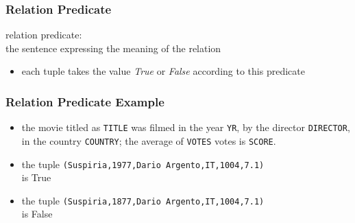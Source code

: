 \documentclass[dvipsnames]{beamer}
\theoremstyle{plain}
\begin{document}
\begin{frame}
  \frametitle{Relation Predicate}

  \begin{definition}
    \alert{relation predicate}:\\
      the sentence expressing the meaning of the relation

    \begin{itemize}
      \item each tuple takes the value \emph{True} or \emph{False} according to
        this predicate
    \end{itemize}
  \end{definition}
\end{frame}

\begin{frame}
  \frametitle{Relation Predicate Example}

  \begin{example}
    \begin{itemize}
      \item the movie titled as \texttt{TITLE} was filmed in the year \texttt{YR},
        by the director \texttt{DIRECTOR}, in the country \texttt{COUNTRY}; the
        average of \texttt{VOTES} votes is \texttt{SCORE}.

      \pause
      \medskip
      \item the tuple \texttt{(Suspiria,1977,Dario Argento,IT,1004,7.1)}\\
        is True
      \item the tuple \texttt{(Suspiria,1877,Dario Argento,IT,1004,7.1)}\\
        is False
    \end{itemize}
  \end{example}
\end{frame}
\end{document}
